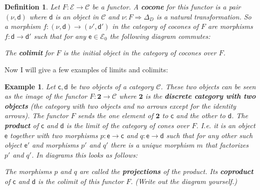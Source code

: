 \documentclass{article}
\newcommand{\cat}[1]{\mathcal{#1}} %
\newcommand{\cato}[1]{\cat{#1}_0} %
\newcommand{\ob}[1]{\mathsf{#1}} %
\newtheorem{definition}[theorem]{Definition}
\newtheorem{example}[theorem]{Example}
\begin{document}
\begin{definition}
	Let $F: \cat{E} \rightarrow \cat{C}$ be a functor. A \textbf{cocone} for this functor is a pair $(\nu, \ob{d})$ where $\ob{d}$ is an object in $\cat{C}$ and $\nu: F \Rightarrow \Delta_D$ is a natural transformation.
	So a morphism $f: (\nu, \ob{d}) \rightarrow (\nu', \ob{d}')$ in the category of cocones of $F$ are morphisms $f: \ob{d} \rightarrow \ob{d}'$ such that for any $\ob{e} \in \cato{E}$ the following diagram commutes:
	The \textbf{colimit} for $F$ is the initial object in the category of cocones over $F$.
\end{definition}

Now I will give a few examples of limits and colimits:

\begin{example}
	Let $\ob{c}, \ob{d}$ be two objects of a category $\cat{C}$. These two objects can be seen as the image of the functor $F: \bm{2} \rightarrow \cat{C}$ where $\bm{2}$ is the \textbf{discrete category with two objects}
	(the category with two objects and no arrows except for the identity arrows). The functor $F$ sends the one element of $\bm{2}$ to $\ob{c}$ and the other to $\ob{d}$.
	The \textbf{product} of $\ob{c}$ and $\ob{d}$ is the limit of the category of cones over $F$.
	I.e. it is an object $\ob{e}$ together with two morphisms $p: \ob{e} \rightarrow \ob{c}$ and $q: \ob{e} \rightarrow \ob{d}$ such that for any other such object $\ob{e}'$ and morphisms $p'$ and $q'$ there is a unique morphism $m$ that factorizes $p'$ and $q'$.
	In diagrams this looks as follows:
	The morphisms $p$ and $q$ are called the \textbf{projections} of the product.
	Its \textbf{coproduct} of $\ob{c}$ and $\ob{d}$ is the colimit of this functor $F$. (Write out the diagram yourself.)
\end{example}
\end{document}
